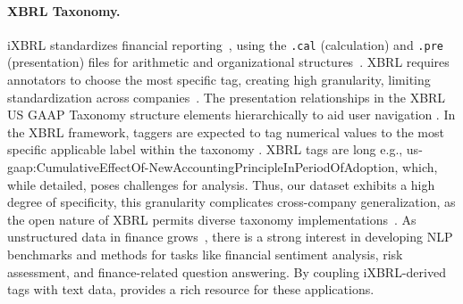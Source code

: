 \paragraph{XBRL Taxonomy.}
iXBRL standardizes financial reporting~\citep{intrinio_xbrl}, using the \texttt{.cal} (calculation) and \texttt{.pre} (presentation) files for arithmetic and organizational structures~\citep{XBRLTaxonomies,XBRL_Presentation,PreparersGuide}. 
XBRL requires annotators to choose the most specific tag, creating high granularity, limiting standardization across companies~\citep{what_intrinio_xbrl}.
The presentation relationships in the XBRL US GAAP Taxonomy structure elements hierarchically to aid user navigation \cite{PreparersGuide}.
In the XBRL framework, taggers are expected to tag numerical values to the most specific applicable label within the taxonomy \cite{PreparersGuide}.
XBRL tags are long e.g., us-gaap:CumulativeEffectOf-NewAccountingPrincipleInPeriodOfAdoption, which, while detailed, poses challenges for analysis. 
Thus, our dataset exhibits a high degree of specificity, this granularity complicates cross-company generalization, as the open nature of XBRL permits diverse taxonomy implementations~\citep{what_intrinio_xbrl}.
As unstructured data in finance grows~\cite{doi:10.1080/00014788.2019.1611730}, there is a strong interest in developing NLP benchmarks and methods for tasks like financial sentiment analysis, risk assessment, and finance-related question answering. 
By coupling iXBRL-derived tags with text data, \hifi{} provides a rich resource for these applications.